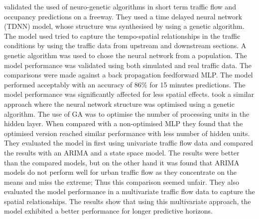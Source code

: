 \citet{abdulhai2002short} validated the used of neuro-genetic algorithms in short term traffic flow and
occupancy predictions on a freeway. They used a time delayed neural network (TDNN) model, whose
structure was synthesised by using a genetic algorithm. The model used tried to capture the
tempo-spatial relationships in the traffic conditions by using the traffic data from upstream and
downstream sections. A genetic algorithm was used to chose the neural network from a population. The
model performance was validated using both simulated and real traffic data. The comparisons were made
against a back propagation feedforward MLP. The model performed acceptably with an accuracy of 86\% for
15 minutes predictions. The model performance was significantly affected for less spatial effects.
\citet{vlahogianni2005optimized} took a similar approach where the neural network structure was optimised
using a genetic algorithm. The use of GA was to optimise the number of processing units in the hidden
layer. When compared with a non-optimised MLP they found that the optimised version reached similar
performance with less number of hidden units. They evaluated the model in first using univariate traffic
flow data and compared the results with an ARIMA and a state space model. The results were better than
the compared models, but on the other hand it was found that ARIMA models do not perform well for urban
traffic flow as they concentrate on the means and miss the extreme; Thus this comparison seemed unfair.
They also evaluated the model performance in a multivariate traffic flow data to capture the spatial
relationships. The results show that using this multivariate approach, the model exhibited a better
performance for longer predictive horizons.

